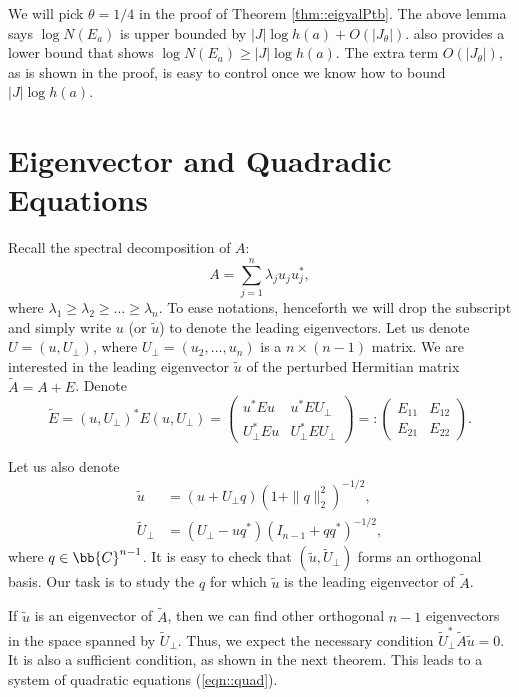 \documentclass[12pt]{article}%
\theoremstyle{plain}%
\theoremstyle{remark}
\begin{document}
We will pick $\theta = 1/4$ in the proof of Theorem \ref{thm::eigvalPtb}. The above lemma says $\log N(E_a)$ is upper bounded by $|J| \log h(a) + O(|J_{\theta}|)$. \cite{Dum04} also provides a lower bound that shows $\log N(E_a) \ge  |J| \log h(a)$. The extra term $O(|J_{\theta}|)$, as is shown in the proof, is easy to control once we know how to bound $ |J| \log h(a)$.


\section{Eigenvector and Quadradic Equations}
Recall the spectral decomposition of $A$:
\begin{equation*}
A = \sum_{j=1}^n \lambda_j u_j u_j^*,
\end{equation*}
where $\lambda_1 \ge \lambda_2 \ge \ldots \ge \lambda_n$. To ease notations, henceforth we will drop the subscript and simply write $u$ (or $\tilde{u}$) to denote the leading eigenvectors. Let us denote $U = (u, U_\bot)$, where $U_\bot = (u_2,\ldots,u_n)$ is a $n \times (n-1)$ matrix. We are interested in the leading eigenvector $\tilde{u}$ of the perturbed Hermitian matrix $\tilde{A} = A + E$. Denote
\begin{equation} \label{eqn::EblockMat}
\tilde{E} = (u, U_\bot)^* E (u, U_\bot) = \left( \begin{array}{cc}
u^* E u & u^* E U_\bot \\ U_\bot^* E u & U_\bot^* E U_\bot \end{array} \right) =: 
\left( \begin{array}{cc}
E_{11} & E_{12} \\ E_{21} & E_{22} \end{array} \right).
\end{equation}

Let us also denote
\begin{align}
\tilde{u} &= (u + U_\bot q ) ( 1 + \| q \|_2^2)^{-1/2}, \label{eqn::tildeu}\\
\tilde{U}_\bot &= (U_\bot - u q^* ) ( I_{n-1} + qq^*)^{-1/2}, \label{eqn::tildeuBot}
\end{align}
where $q \in \bb{C}^{n-1}$. It is easy to check that $(\tilde{u}, \tilde{U}_\bot)$ forms an orthogonal basis. Our task is to study the $q$ for which $\tilde{u}$ is the leading eigenvector of $\tilde{A}$. 

If $\tilde{u}$ is an eigenvector of $\tilde{A}$, then we can find other orthogonal $n-1$ eigenvectors in the space spanned by $\tilde{U}_\bot$. Thus, we expect the necessary condition $\tilde{U}_\bot^* \tilde{A} \tilde{u} = 0$. It is also a sufficient condition, as shown in the next theorem. This leads to a system of quadratic equations (\ref{eqn::quad}).
\end{document}
